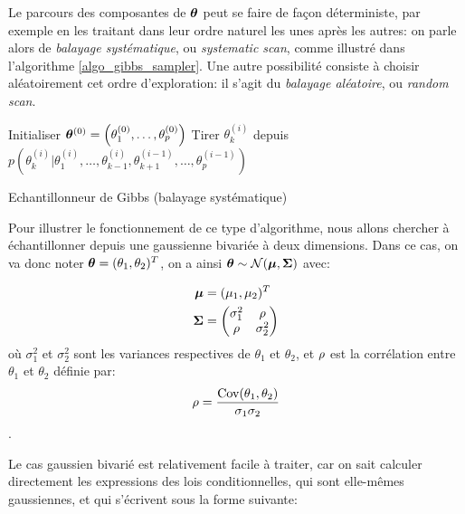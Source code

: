 Le parcours des composantes de ${\bm{\theta}}$ peut se faire de façon déterministe, par exemple en les traitant dans leur ordre naturel les unes après les autres: on parle alors de \textit{balayage systématique}, ou \textit{systematic scan}, comme illustré dans l'algorithme \ref{algo_gibbs_sampler}. Une autre possibilité consiste à choisir aléatoirement cet ordre d'exploration: il s'agit du \textit{balayage aléatoire}, ou \textit{random scan}. \\


\begin{algorithm}
	\begin{algorithmic}
	\State Initialiser ${\bm{\theta}}^{(0)} = \left(\theta_1^{(0)}, \dots, \theta_p^{(0)}\right)$
			\State Tirer $\theta_k^{(i)}$ depuis $p(\theta_k^{(i)} | \theta_1^{(i)}, \dots, \theta_{k-1}^{(i)}, \theta_{k+1}^{(i-1)}, \dots, \theta_p^{(i-1)})$
			\EndFor
		\EndFor
	\end{algorithmic}
	\caption{Echantillonneur de Gibbs (balayage systématique)}
	\label{algo_gibbs_sampler}
\end{algorithm}

Pour illustrer le fonctionnement de ce type d'algorithme, nous allons chercher à échantillonner depuis une gaussienne bivariée à deux dimensions. Dans ce cas, on va donc noter ${\bm{\theta}} = (\theta_1, \theta_2)^T$, on a ainsi ${\bm{\theta}} \sim \mathcal{N}({\bm{\mu}}, {\bm{\Sigma}})$ avec: 

\begin{equation}
	{
	\label{eq_caracs_gaussienne_bivariee}
	\begin{split}
	{\bm{\mu}}&= (\mu_1, \mu_2)^T \\
	{\bm{\Sigma}}&= \begin{pmatrix}
	\sigma_{1}^2 & {\rho}\\
	 {\rho}& \sigma_{2}^2 
	\end{pmatrix}
	\end{split}
	}
\end{equation} 
où $\sigma_1^2$ et $\sigma_2^2$ sont les variances respectives de $\theta_1$ et $\theta_2$, et {${\rho}$} est la corrélation entre $\theta_1$ et $\theta_2$ définie par: {$${\rho} = \dfrac{\text{Cov}(\theta_1,\theta_2)}{\sigma_1\sigma_2}$$.}

Le cas gaussien bivarié est relativement facile à traiter, car on sait calculer directement les expressions des lois conditionnelles, qui sont elle-mêmes gaussiennes, et qui s'écrivent sous la forme suivante:

